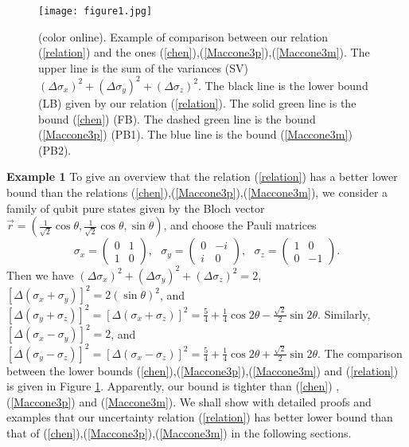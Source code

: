 \documentclass[fleqn,10pt]{wlscirep}
\begin{document}
\begin{figure}[ht]
\centering
\texttt{[image: figure1.jpg]}
\caption{(color online). Example of comparison between our relation (\ref{relation}) and the ones (\ref{chen}),(\ref{Maccone3p}),(\ref{Maccone3m}).  The upper line is the sum of the variances (SV) $(\Delta \sigma_x)^{2}+(\Delta \sigma_y)^{2}+(\Delta \sigma_z)^{2}$. The black line is the lower bound (LB) given by our relation (\ref{relation}).
The solid green line is the bound (\ref{chen}) (FB). The dashed green line is the bound (\ref{Maccone3p}) (PB1). The blue line is the bound (\ref{Maccone3m}) (PB2).}\label{f1}
\end{figure}

{\bf Example 1} To give an overview that the relation (\ref{relation}) has a better lower bound than the relations (\ref{chen}),(\ref{Maccone3p}),(\ref{Maccone3m}), we consider a family of qubit pure states given by the Bloch vector
$\vec{r}=(\frac{1}{\sqrt{2}}\cos\theta,\frac{1}{\sqrt{2}}\cos\theta,\sin\theta)$, and choose the Pauli matrices
%
\begin{equation*}
\sigma_{x}=\begin{pmatrix}
0 & 1\\1 & 0
\end{pmatrix},~~~
\sigma_{y}=\begin{pmatrix}
0 & -i\\i & 0
\end{pmatrix},~~~
\sigma_{z}=\begin{pmatrix}
1 & 0\\0 & -1
\end{pmatrix}.
\end{equation*}
%
Then we have $(\Delta \sigma_{x})^{2}+(\Delta \sigma_{y})^{2}+(\Delta \sigma_{z})^{2}=2$,
$[\Delta( \sigma_{x}+ \sigma_{y})]^{2}=2(\sin\theta)^2$,
and $[\Delta( \sigma_{y}+ \sigma_{z})]^{2}=[\Delta( \sigma_{x}+ \sigma_{z})]^{2}
=\frac{5}{4}+\frac{1}{4}\cos2\theta-\frac{\sqrt{2}}{2}\sin2\theta$.
Similarly, $[\Delta( \sigma_{x}- \sigma_{y})]^{2}=2$, and $[\Delta( \sigma_{y}- \sigma_{z})]^{2}=[\Delta( \sigma_{x}- \sigma_{z})]^{2}=\frac{5}{4}+\frac{1}{4}\cos2\theta+\frac{\sqrt{2}}{2}\sin2\theta$.
The comparison between the lower bounds (\ref{chen}),(\ref{Maccone3p}),(\ref{Maccone3m}) and (\ref{relation})
is given in Figure \ref{f1}.
Apparently, our bound is tighter than (\ref{chen}) ,(\ref{Maccone3p}) and (\ref{Maccone3m}). We shall show with detailed proofs and examples that our uncertainty relation (\ref{relation}) has better lower bound than that of (\ref{chen}),(\ref{Maccone3p}),(\ref{Maccone3m}) in the following sections.
\end{document}
